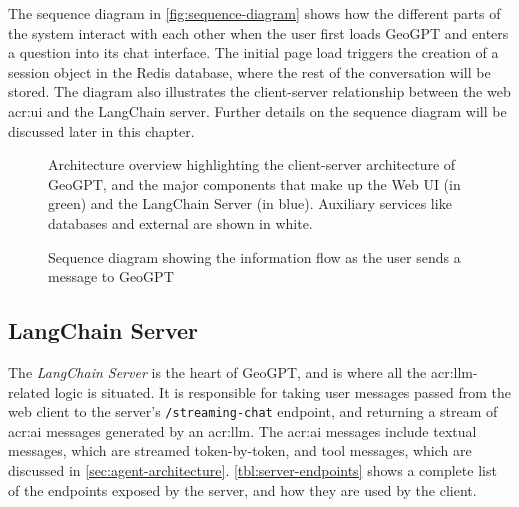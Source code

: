 The sequence diagram in \autoref{fig:sequence-diagram} shows how the different parts of the system interact with each other when the user first loads GeoGPT and enters a question into its chat interface. The initial page load triggers the creation of a session object in the Redis database, where the rest of the conversation will be stored. The diagram also illustrates the client-server relationship between the web \acrshort{acr:ui} and the LangChain server. Further details on the sequence diagram will be discussed later in this chapter.

\begin{figure}
    \centering
    \caption[Architecture overview for GeoGPT]{Architecture overview highlighting the client-server architecture of GeoGPT, and the major components that make up the Web UI (in green) and the LangChain Server (in blue). Auxiliary services like databases and external  are shown in white.}
    \label{fig:architecture-overview}
\end{figure}

\begin{figure}
    \caption[Sequence diagram for GeoGPT]{Sequence diagram showing the information flow as the user sends a message to GeoGPT}
    \label{fig:sequence-diagram}
\end{figure}


\subsection{LangChain Server}\label{subsec:langchain-server}
\label{subsec:langchain-server-architecture}

The \textit{LangChain Server} is the heart of GeoGPT, and is where all the \acrshort{acr:llm}-related logic is situated. It is responsible for taking user messages passed from the web client to the server's \texttt{/streaming-chat} endpoint, and returning a stream of \acrshort{acr:ai} messages generated by an \acrshort{acr:llm}. The \acrshort{acr:ai} messages include textual messages, which are streamed token-by-token, and tool messages, which are discussed in \autoref{sec:agent-architecture}. \autoref{tbl:server-endpoints} shows a complete list of the endpoints exposed by the server, and how they are used by the client.

